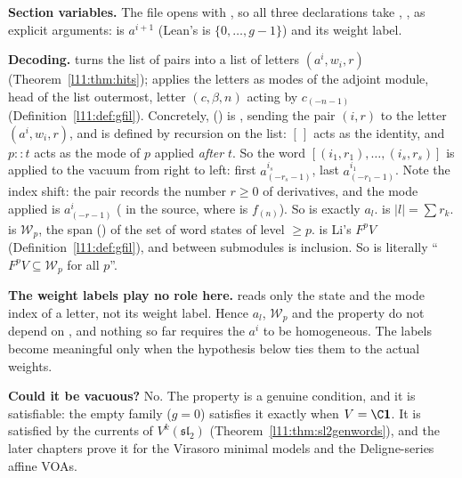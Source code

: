 \begin{dictionary}
\textbf{Section variables.} The file opens with , so all three declarations take , ,  as explicit arguments:  is
$a^{i+1}$ (Lean's  is $\{0,\dots,g-1\}$) and  its weight label.

\textbf{Decoding.}  turns the list of pairs into a list of letters
$(a^{i},w_i,r)$ (Theorem~\ref{l11:thm:hits});  applies the letters as modes of the
adjoint module, head of the list outermost, letter $(c,\beta,n)$ acting by $c_{(-n-1)}$ (Definition~\ref{l11:def:gfil}).
Concretely,  () is , sending the
pair $(i,r)$ to the letter $(a^i,w_i,r)$, and  is defined by recursion on the list:
$[\,]$ acts as the identity, and $p::t$ acts as the mode of $p$ applied \emph{after} $t$. So the word
$[(i_1,r_1),\dots,(i_s,r_s)]$ is applied to the vacuum from right to left: first $a^{i_s}_{(-r_s-1)}$, last
$a^{i_1}_{(-r_1-1)}$. Note the index shift: the pair records the number $r\ge0$ of derivatives, and the mode applied
is $a^i_{(-r-1)}$ ( in the source, where  is $f_{(n)}$).
So  is exactly $a_l$.  is $|l| = \sum r_k$. 
is $\mathcal W_p$, the span () of the set of word states of level $\ge p$.  is Li's
$F^pV$ (Definition~\ref{l11:def:gfil}), and  between submodules is inclusion. So
 is literally ``$F^pV\subseteq \mathcal W_p$ for all $p$''.

\textbf{The weight labels play no role here.}  reads only the state and the mode index of a letter,
not its weight label. Hence $a_l$, $\mathcal W_p$ and the property do not depend on , and nothing so far requires the
$a^i$ to be homogeneous. The labels become meaningful only when the hypothesis  below ties them to the
actual weights.

\textbf{Could it be vacuous?} No. The property is a genuine condition, and it is satisfiable: the empty family
($g=0$) satisfies it exactly when $V=\C\lelevenvac$. It is satisfied by the currents of
$V^k(\mathfrak{sl}_2)$ (Theorem~\ref{l11:thm:sl2genwords}), and the later chapters prove it for the Virasoro minimal
models and the Deligne-series affine VOAs.
\end{dictionary}

